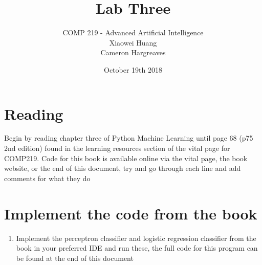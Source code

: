 \documentclass[12pt]{article}
\begin{document}


\date{October 19th 2018}
 
 
\title{Lab Three}%
\author{COMP 219 - Advanced Artificial Intelligence \\
		Xiaowei Huang \\ 
		Cameron Hargreaves\\}
 
\maketitle

\section{Reading}
Begin by reading chapter three of Python Machine Learning until page 68 (p75 2nd edition) found in the learning resources section of the vital page for COMP219. Code for this book is available online via the vital page, the book website, or the end of this document, try and go through each line and add comments for what they do

\section{Implement the code from the book}
\begin{enumerate}
\item Implement the perceptron classifier and logistic regression classifier from the book in your preferred IDE and run these, the full code for this program can be found at the end of this document 
\end{enumerate}
\end{document}
